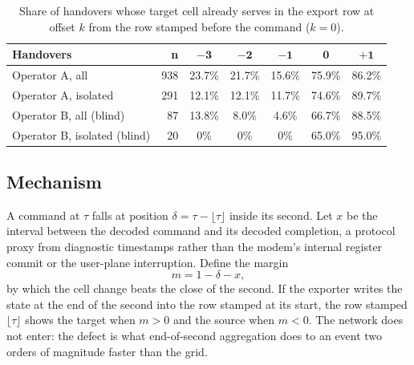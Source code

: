 \documentclass[preprint,review,12pt]{elsarticle}\usepackage{lineno}\linenumbers
\begin{document}
\begin{table}[t]
\centering
\caption{Share of handovers whose target cell already serves in the export row at offset $k$ from the row stamped before the command ($k=0$).}
\label{tab:align}
\footnotesize
\setlength{\tabcolsep}{3pt}
\begin{tabularx}{\linewidth}{X r c c c c c}
\toprule
\textbf{Handovers} & \textbf{n} & $\mathbf{-3}$ & $\mathbf{-2}$ & $\mathbf{-1}$ & $\mathbf{0}$ & $\mathbf{+1}$ \\
\midrule
Operator A, all & 938 & 23.7\% & 21.7\% & 15.6\% & 75.9\% & 86.2\% \\
Operator A, isolated & 291 & 12.1\% & 12.1\% & 11.7\% & 74.6\% & 89.7\% \\
Operator B, all (blind) & 87 & 13.8\% & 8.0\% & 4.6\% & 66.7\% & 88.5\% \\
Operator B, isolated (blind) & 20 & 0\% & 0\% & 0\% & 65.0\% & 95.0\% \\
\bottomrule
\end{tabularx}
\end{table}

\subsection{Mechanism}
A command at $\tau$ falls at position $\delta = \tau - \lfloor\tau\rfloor$ inside its second. Let $x$ be the interval between the decoded command and its decoded completion, a protocol proxy from diagnostic timestamps rather than the modem's internal register commit or the user-plane interruption. Define the margin
\begin{equation}
m = 1 - \delta - x,
\label{eq:margin}
\end{equation}
by which the cell change beats the close of the second. If the exporter writes the state at the end of the second into the row stamped at its start, the row stamped $\lfloor\tau\rfloor$ shows the target when $m>0$ and the source when $m<0$. The network does not enter: the defect is what end-of-second aggregation does to an event two orders of magnitude faster than the grid.
\end{document}
